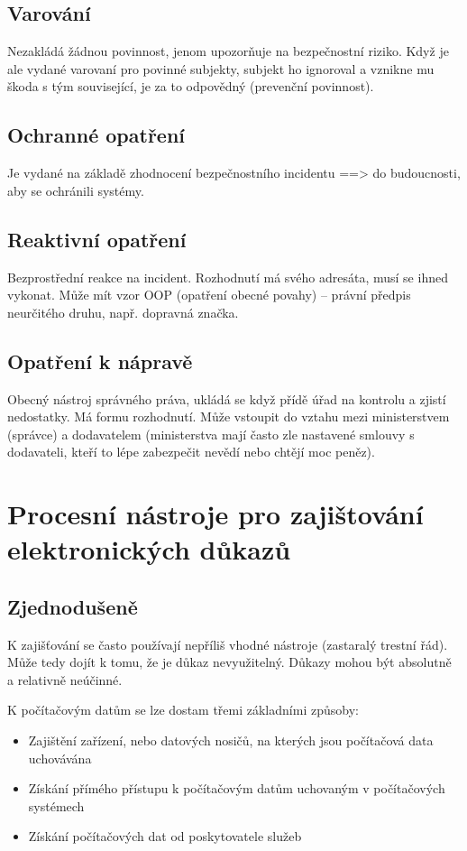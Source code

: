\subsection*{Varování}
Nezakládá žádnou povinnost, jenom upozorňuje na bezpečnostní riziko. Když je ale vydané varovaní pro povinné subjekty, subjekt ho ignoroval a vznikne mu škoda s tým související, je za to odpovědný (prevenční povinnost).

\subsection*{Ochranné opatření}
Je vydané na základě zhodnocení bezpečnostního incidentu ==> do budoucnosti, aby se ochránili systémy.

\subsection*{Reaktivní opatření}
Bezprostřední reakce na incident. Rozhodnutí má svého adresáta, musí se ihned vykonat. Může mít vzor OOP (opatření obecné povahy) -- právní předpis neurčitého druhu, např. dopravná značka.

\subsection*{Opatření k nápravě}
Obecný nástroj správného práva, ukládá se když přídě úřad na kontrolu a zjistí nedostatky. Má formu rozhodnutí. Může vstoupit do vztahu mezi ministerstvem (správce) a dodavatelem (ministerstva mají často zle nastavené smlouvy s dodavateli, kteří to lépe zabezpečit nevědí nebo chtějí moc peněz).


\clearpage
\section{Procesní nástroje pro zajištování elektronických důkazů}
\subsection{Zjednodušeně}

K zajišťování se často používají nepříliš vhodné nástroje (zastaralý trestní řád). Může tedy dojít k tomu, že je důkaz nevyužitelný. Důkazy mohou být absolutně a relativně neúčinné.

K počítačovým datům se lze dostam třemi základními způsoby:
\begin{itemize}
    \item Zajištění zařízení, nebo datových nosičů, na kterých jsou počítačová data uchovávána
    \item Získání přímého přístupu k počítačovým datům uchovaným v počítačových systémech
    \item Získání počítačových dat od poskytovatele služeb
\end{itemize}

